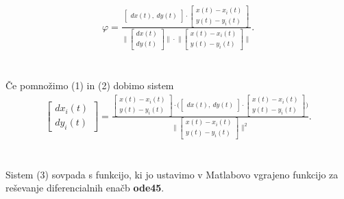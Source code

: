 \documentclass[a4paper,12pt]{article}
\begin{document}
\begin{align}
    \varphi = 
    \frac{
    \begin{bmatrix} 
        dx(t), \ %
        dy(t)
    \end{bmatrix}
    \cdot
    \begin{bmatrix} 
        x(t) - x_i(t) \\
        y(t) - y_i(t)
    \end{bmatrix}
    }
    {
    \Big \|
    \begin{bmatrix} 
        dx(t) \\
        dy(t)
    \end{bmatrix}
    \Big \| 
    \cdot
    \Big \|
    \begin{bmatrix} 
        x(t) - x_i(t) \\
        y(t) - y_i(t)
    \end{bmatrix}
    \Big \| 
    }
    .
\end{align}
\\
\\
Če pomnožimo (1) in (2) dobimo sistem \\
\begin{align}
    \begin{bmatrix} 
        dx_i(t) \\
        dy_i(t) 
    \end{bmatrix}
    =
    \frac{
    \begin{bmatrix} 
        x(t) - x_i(t) \\
        y(t) - y_i(t)
    \end{bmatrix}
    \cdot
    \Big(
    \begin{bmatrix} 
        dx(t), \ %
        dy(t)
    \end{bmatrix}
    \cdot
    \begin{bmatrix} 
        x(t) - x_i(t) \\
        y(t) - y_i(t)
    \end{bmatrix}
    \Big)
    }
    {
    \Big \|
    \begin{bmatrix} 
        x(t) - x_i(t) \\
        y(t) - y_i(t)
    \end{bmatrix}
    \Big \| ^ {2}
    }
    .
\end{align}
\\
\\
Sistem (3) sovpada s funkcijo, ki jo ustavimo v Matlabovo vgrajeno funkcijo za reševanje diferencialnih enačb 
\textbf{ode45}.
\\
\\
\end{document}
